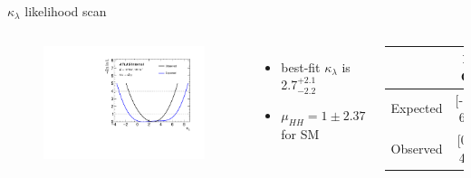 \begin{frame}{$\kappa_{\lambda}$ likelihood scan}

\begin{columns}
\begin{figure}
    \centering
    \includegraphics[width=1.\textwidth]{BackUp/Part3/Img/figures_Results_scan_hhyybb_kl.pdf}
\end{figure}    
\begin{itemize}
    \item best-fit $\kappa_{\lambda}$ is 2.7$^{+2.1}_{-2.2}$
    \item $\mu_{HH} = 1 \pm 2.37$ for SM
\end{itemize}
\begin{table}[]
    \centering
    \begin{tabular}{lcc}
    \hline\hline
        & 1$\sigma$ CI & 2$\sigma$ CI  \\
    \hline    
        Expected & [-1.4, 6.4] & [-3.1, 8.2] \\
        Observed & [0.5, 4.7] & [-1.4, 6.5]\\
    \hline\hline    
    \end{tabular}

\end{table}
\end{columns}    
\end{frame}

